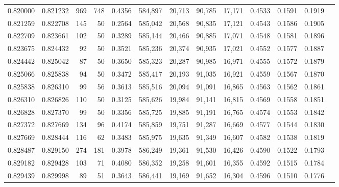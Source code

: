 \begin{tabular}{rrrrrrrrrrrrr}
0.820000 & 0.821232 &   969 & 748 &                                     0.4356 & 584,897 &  20,713 &  90,785 &  17,171 & 0.4533 & 0.1591 & 0.1919 \\
0.821259 & 0.822708 &   145 &  50 &                                     0.2564 & 585,042 &  20,568 &  90,835 &  17,121 & 0.4543 & 0.1586 & 0.1905 \\
0.822709 & 0.823661 &   102 &  50 &                                     0.3289 & 585,144 &  20,466 &  90,885 &  17,071 & 0.4548 & 0.1581 & 0.1896 \\
0.823675 & 0.824432 &    92 &  50 &                                     0.3521 & 585,236 &  20,374 &  90,935 &  17,021 & 0.4552 & 0.1577 & 0.1887 \\
0.824442 & 0.825042 &    87 &  50 &                                     0.3650 & 585,323 &  20,287 &  90,985 &  16,971 & 0.4555 & 0.1572 & 0.1879 \\
0.825066 & 0.825838 &    94 &  50 &                                     0.3472 & 585,417 &  20,193 &  91,035 &  16,921 & 0.4559 & 0.1567 & 0.1870 \\
0.825838 & 0.826310 &    99 &  56 &                                     0.3613 & 585,516 &  20,094 &  91,091 &  16,865 & 0.4563 & 0.1562 & 0.1861 \\
0.826310 & 0.826826 &   110 &  50 &                                     0.3125 & 585,626 &  19,984 &  91,141 &  16,815 & 0.4569 & 0.1558 & 0.1851 \\
0.826828 & 0.827370 &    99 &  50 &                                     0.3356 & 585,725 &  19,885 &  91,191 &  16,765 & 0.4574 & 0.1553 & 0.1842 \\
0.827372 & 0.827669 &   134 &  96 &                                     0.4174 & 585,859 &  19,751 &  91,287 &  16,669 & 0.4577 & 0.1544 & 0.1830 \\
0.827669 & 0.828444 &   116 &  62 &                                     0.3483 & 585,975 &  19,635 &  91,349 &  16,607 & 0.4582 & 0.1538 & 0.1819 \\
0.828487 & 0.829150 &   274 & 181 &                                     0.3978 & 586,249 &  19,361 &  91,530 &  16,426 & 0.4590 & 0.1522 & 0.1793 \\
0.829182 & 0.829428 &   103 &  71 &                                     0.4080 & 586,352 &  19,258 &  91,601 &  16,355 & 0.4592 & 0.1515 & 0.1784 \\
0.829439 & 0.829998 &    89 &  51 &                                     0.3643 & 586,441 &  19,169 &  91,652 &  16,304 & 0.4596 & 0.1510 & 0.1776 \\

\end{tabular}
